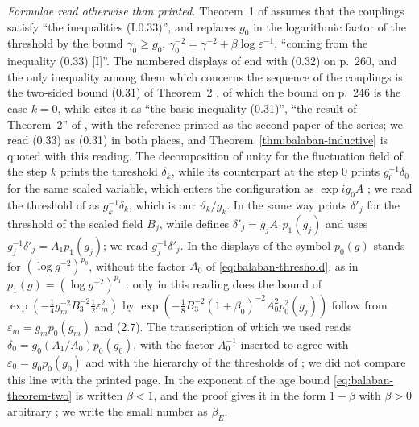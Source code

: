 \documentclass[11pt]{preprint}
\numberwithin{equation}{section}
\theoremstyle{definition}
\theoremstyle{remark}
\theoremstyle{plain}
\begin{document}
\emph{Formulae read otherwise than printed.} Theorem~1 of \cite[p.~262]{BalabanCRE} assumes that the couplings satisfy ``the inequalities (I.0.33)'', and \cite[p.~246]{BalabanCRE} replaces $g_0$ in the logarithmic factor of the threshold by the bound $\gamma_0 \geq g_0$, $\gamma_0^{-2} = \gamma^{-2} + \beta\log\varepsilon^{-1}$, ``coming from the inequality (0.33) [I]''. The numbered displays of \cite[Sect.~0]{BalabanRG1} end with (0.32) on p.~260, and the only inequality among them which concerns the sequence of the couplings is the two-sided bound (0.31) of Theorem~2 \cite[p.~259]{BalabanRG1}, of which the bound on p.~246 is the case $k = 0$, while \cite[p.~355]{BalabanLFR2} cites it as ``the basic inequality (0.31)'', ``the result of Theorem~2'' of \cite{BalabanRG1}, with the reference printed as the second paper of the series; we read (0.33) as (0.31) in both places, and Theorem~\ref{thm:balaban-inductive} is quoted with this reading. The decomposition of unity \cite[(3.16), p.~268]{BalabanCRE} for the fluctuation field of the step $k$ prints the threshold $\delta_k$, while its counterpart at the step $0$ \cite[(1.18), p.~250]{BalabanCRE} prints $g_0^{-1}\delta_0$ for the same scaled variable, which enters the configuration as $\exp ig_0A$ \cite[(1.19), p.~250]{BalabanCRE}; we read the threshold of \cite[(3.16)]{BalabanCRE} as $g_k^{-1}\delta_k$, which is our $\vartheta_k/g_k$. In the same way \cite[(1.55), p.~188]{BalabanLFR1} prints $\delta'_j$ for the threshold of the scaled field $B_j$, while \cite[p.~183]{BalabanLFR1} defines $\delta'_j = g_jA_1p_1(g_j)$ and \cite[p.~383]{BalabanLFR2} uses $g_j^{-1}\delta'_j = A_1p_1(g_j)$; we read $g_j^{-1}\delta'_j$. In the displays of \cite[pp.~380--383]{BalabanLFR2} the symbol $p_0(g)$ stands for $(\log g^{-2})^{p_0}$, without the factor $A_0$ of \eqref{eq:balaban-threshold}, as in $p_1(g) = (\log g^{-2})^{p_1}$ \cite[p.~183]{BalabanLFR1}: only in this reading does the bound of $\exp(-\frac14g_m^{-2}B_3^{-2}\frac12\varepsilon_m^2)$ by $\exp(-\frac18B_3^{-2}(1 + \beta_0)^{-2}A_0^2p_0^2(g_j))$ \cite[p.~381]{BalabanLFR2} follow from $\varepsilon_m = g_mp_0(g_m)$ and (2.7). The transcription of \cite[(1.8), p.~247]{BalabanCRE} which we used reads $\delta_0 = g_0(A_1/A_0)p_0(g_0)$, with the factor $A_0^{-1}$ inserted to agree with $\varepsilon_0 = g_0p_0(g_0)$ and with the hierarchy of the thresholds of \cite[(3.7)--(3.9)]{BalabanCRE}; we did not compare this line with the printed page. In \cite[Theorem~2]{BalabanCRE} the exponent of the age bound \eqref{eq:balaban-theorem-two} is written $\beta < 1$, and the proof gives it in the form $1 - \beta$ with $\beta > 0$ arbitrary \cite[p.~283]{BalabanCRE}; we write the small number as $\beta_E$.
\end{document}
